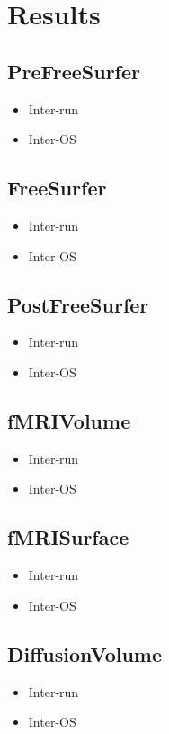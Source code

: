 \chapter{Results}

\section{PreFreeSurfer}
  \begin{itemize}
    \item Inter-run
    \item Inter-OS
  \end{itemize}
  
\section{FreeSurfer}
\begin{itemize}
    \item Inter-run
    \item Inter-OS
  \end{itemize}
  
\section{PostFreeSurfer}
\begin{itemize}
    \item Inter-run
    \item Inter-OS
  \end{itemize}
  
\section{fMRIVolume}
\begin{itemize}
    \item Inter-run
    \item Inter-OS
  \end{itemize}
  
\section{fMRISurface}
\begin{itemize}
    \item Inter-run
    \item Inter-OS
  \end{itemize}
  
\section{DiffusionVolume}
\begin{itemize}
    \item Inter-run
    \item Inter-OS
  \end{itemize}

